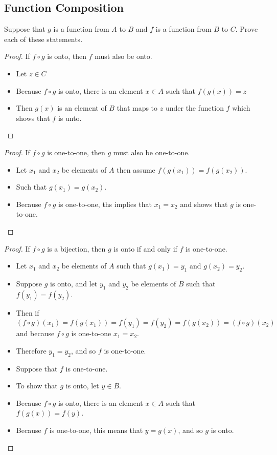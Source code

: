 \subsection{Function Composition}
Suppose that \(g\) is a function from \(A\) to \(B\) and \(f\) is a function from \(B\) to \(C\). Prove
each of these statements.
\begin{proof}
    If \(f \circ g\) is onto, then \(f\) must also be onto.
    \begin{itemize}
        \item Let \(z \in C\)
        \item Because \(f \circ g\) is onto, there is an element \(x \in A\) such that \(f(g(x)) = z\)
        \item Then \(g(x)\) is an element of \(B\) that maps to \(z\) under the function \(f\) which shows that \(f\) is unto.
    \end{itemize}
\end{proof}
\begin{proof}
    If \(f \circ g\) is one-to-one, then \(g\) must also be one-to-one.
    \begin{itemize}
        \item Let \(x_1\) and \(x_2\) be elements of \(A\) then assume \(f(g(x_1)) = f(g(x_2))\).
        \item Such that \(g(x_1) = g(x_2)\).
        \item Because \(f \circ g\) is one-to-one, ths implies that \(x_1 = x_2\) and shows that \(g\) is one-to-one.
    \end{itemize}
\end{proof}
\begin{proof}
    If \(f \circ g\) is a bijection, then \(g\) is onto if and only if \(f\) is one-to-one.
    \begin{itemize}
        \item Let \(x_1\) and \(x_2\) be elements of \(A\) such that \(g(x_1) = y_1\) and \(g(x_2) = y_2\).
        \item Suppose \(g\) is onto, and let \(y_1\) and \(y_2\) be elements of \(B\) such that \(f(y_1) = f(y_2)\).
        \item Then if \((f \circ g)(x_1) = f(g(x_1)) = f(y_1) = f(y_2) = f(g(x_2)) = (f \circ g)(x_2)\) and because \(f \circ g\) is one-to-one \(x_1 = x_2\).
        \item Therefore \(y_1 = y_2\), and so \(f\) is one-to-one.
    \end{itemize}
    \begin{itemize}
        \item Suppose that \(f\) is one-to-one.
        \item To show that \(g\) is onto, let \(y \in B\).
        \item Because \(f \circ g\) is onto, there is an element \(x \in A\) such that \(f(g(x)) = f(y)\).
        \item Because \(f\) is one-to-one, this means that \(y = g(x)\), and so \(g\) is onto.
    \end{itemize}
\end{proof}
